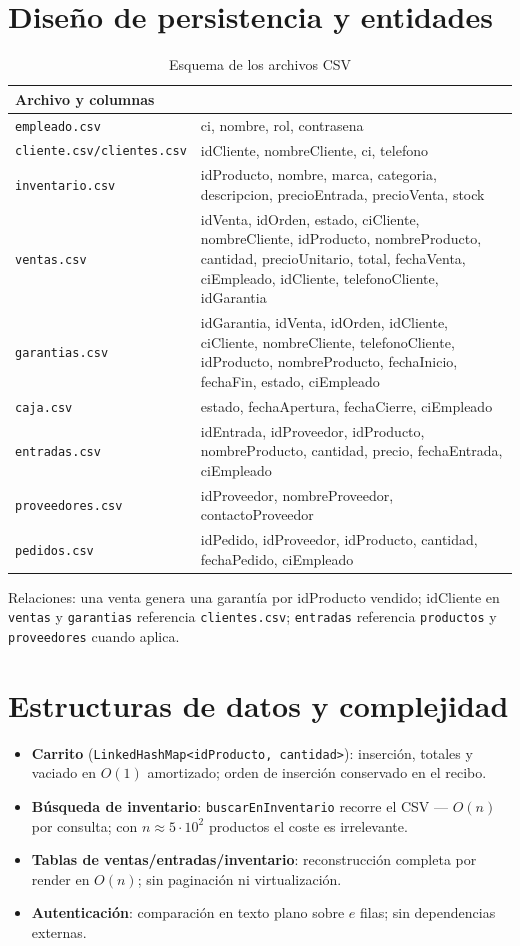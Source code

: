 \section{Diseño de persistencia y entidades}
\begin{table}[H]\centering\caption{Esquema de los archivos CSV}\begin{tabular}{p{}p{}}\toprule
Archivo y columnas\\\midrule
\texttt{empleado.csv} & ci, nombre, rol, contrasena\\
\texttt{cliente.csv/clientes.csv} & idCliente, nombreCliente, ci, telefono\\
\texttt{inventario.csv} & idProducto, nombre, marca, categoria, descripcion, precioEntrada, precioVenta, stock\\
\texttt{ventas.csv} & idVenta, idOrden, estado, ciCliente, nombreCliente, idProducto, nombreProducto, cantidad, precioUnitario, total, fechaVenta, ciEmpleado, idCliente, telefonoCliente, idGarantia\\
\texttt{garantias.csv} & idGarantia, idVenta, idOrden, idCliente, ciCliente, nombreCliente, telefonoCliente, idProducto, nombreProducto, fechaInicio, fechaFin, estado, ciEmpleado\\
\texttt{caja.csv} & estado, fechaApertura, fechaCierre, ciEmpleado\\
\texttt{entradas.csv} & idEntrada, idProveedor, idProducto, nombreProducto, cantidad, precio, fechaEntrada, ciEmpleado\\
\texttt{proveedores.csv} & idProveedor, nombreProveedor, contactoProveedor\\
\texttt{pedidos.csv} & idPedido, idProveedor, idProducto, cantidad, fechaPedido, ciEmpleado\\\bottomrule\end{tabular}\end{table}

Relaciones: una venta genera una garantía por idProducto vendido; idCliente en \texttt{ventas} y \texttt{garantias} referencia \texttt{clientes.csv}; \texttt{entradas} referencia \texttt{productos} y \texttt{proveedores} cuando aplica.

\section{Estructuras de datos y complejidad}
\begin{itemize}
\item \textbf{Carrito} (\texttt{LinkedHashMap<idProducto, cantidad>}): inserción, totales y vaciado en $O(1)$ amortizado; orden de inserción conservado en el recibo.
\item \textbf{Búsqueda de inventario}: \texttt{buscarEnInventario} recorre el CSV — $O(n)$ por consulta; con $n\approx 5\cdot10^2$ productos el coste es irrelevante.
\item \textbf{Tablas de ventas/entradas/inventario}: reconstrucción completa por render en $O(n)$; sin paginación ni virtualización.
\item \textbf{Autenticación}: comparación en texto plano sobre $e$ filas; sin dependencias externas.
\end{itemize}
